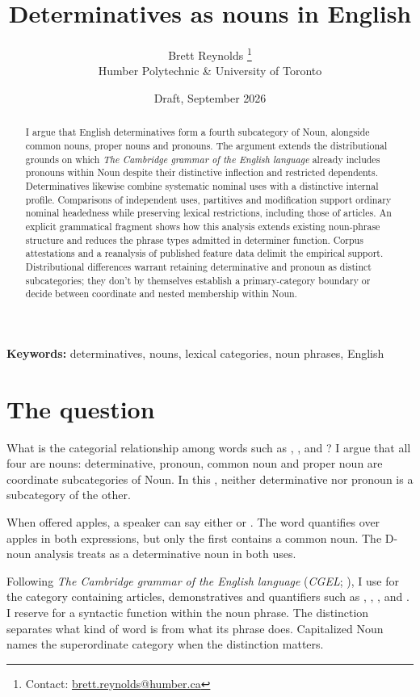 \documentclass[12pt]{article}
\title{Determinatives as nouns in English}
\author{Brett Reynolds \orcidlink{0000-0003-0073-7195}%
\thanks{Contact: \href{mailto:brett.reynolds@humber.ca}{brett.reynolds@humber.ca}}\\
Humber Polytechnic \& University of Toronto}
\date{Draft, September 2026}
\begin{document}
\maketitle

\begin{abstract}
I argue that English determinatives form a fourth subcategory of Noun, alongside common nouns, proper nouns and pronouns. The argument extends the distributional grounds on which \textit{The Cambridge grammar of the English language} already includes pronouns within Noun despite their distinctive inflection and restricted dependents. Determinatives likewise combine systematic nominal uses with a distinctive internal profile. Comparisons of independent uses, partitives and modification support ordinary nominal headedness while preserving lexical restrictions, including those of articles. An explicit grammatical fragment shows how this analysis extends existing noun-phrase structure and reduces the phrase types admitted in determiner function. Corpus attestations and a reanalysis of published feature data delimit the empirical support. Distributional differences warrant retaining determinative and pronoun as distinct subcategories; they don't by themselves establish a primary-category boundary or decide between coordinate and nested membership within Noun.
\end{abstract}

\noindent\textbf{Keywords:} determinatives, nouns, lexical categories, noun phrases, English

\section{The question}\label{sec:intro}

What is the categorial relationship among words such as , ,  and ? I argue that all four are nouns: determinative, pronoun, common noun and proper noun are coordinate subcategories of Noun. In this , neither determinative nor pronoun is a subcategory of the other.

When offered apples, a speaker can say either  or . The word  quantifies over apples in both expressions, but only the first contains a common noun. The D-noun analysis treats  as a determinative noun in both uses.

Following \textit{The Cambridge grammar of the English language} (\textit{CGEL}; \citealt{huddleston2002}), I use  for the category containing articles, demonstratives and quantifiers such as , , ,  and . I reserve  for a syntactic function within the noun phrase. The distinction separates what kind of word  is from what its phrase does. Capitalized Noun names the superordinate category when the distinction matters.
\end{document}
